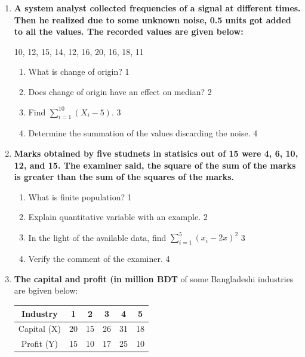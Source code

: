 \documentclass[a4paper,oneside]{book}
\begin{document}
\begin{enumerate}

     \item
	  \textbf{A system analyst collected frequencies of a signal at different times. Then he realized due to some unknown noise, 0.5 units got added to all the values. The recorded values are given below:} 
	  
	  \begin{center}
	  10, 12, 15, 14, 12, 16, 20, 16, 18, 11
	  \end{center}
  
  \begin{enumerate}
    \item
	What is change of origin? \hfill 1
    \item
	Does change of origin have an effect on median? \hfill 2
    \item  
	Find $\displaystyle \sum_{i=1}^{10} (X_i-5)$. \hfill 3
    \item
	Determine the summation of the values discarding the noise. \hfill 4
  \end{enumerate}

 \item
	  \textbf{Marks obtained by five studnets in statisics out of 15 were 4, 6, 10, 12, and 15. The examiner said, the square of the sum of the marks is greater than the sum of the squares of the marks.} 
  
  \begin{enumerate}
    \item
	What is finite population? \hfill 1
    \item
	Explain quantitative variable with an example. \hfill 2
    \item  
	In the light of the available data, find $\displaystyle \sum_{i=1}^5 (x_i-2x)^2$ \hfill 3
    \item
	Verify the comment of the examiner. \hfill 4
  \end{enumerate}

   \item
	  \textbf{The capital and profit (in million BDT} of some Bangladeshi industries are bgiven below: 
	  
	  \begin{table}[h]
	  \centering
\begin{tabular}{c|ccccc}
Industry & 1 & 2 & 3 & 4 & 5 \\ \hline
Capital (X) & 20 & 15 & 26 & 31 & 18 \\ \hline
Profit (Y) & 15 & 10 & 17 & 25 & 10
\end{tabular}
\end{table}
  

\end{enumerate}
\end{document}

